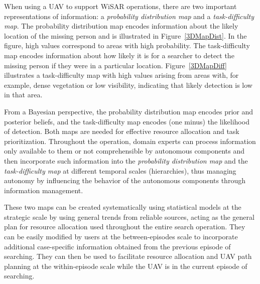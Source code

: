 When using a UAV to support WiSAR operations, there are two important representations of information: a \textit{probability distribution map} and a \textit{task-difficulty map}. The probability distribution map encodes information about the likely location of the missing person and is illustrated in Figure~\ref{3DMapDist}. In the figure, high values correspond to areas with high probability. The task-difficulty map encodes information about how likely it is for a searcher to detect the missing person if they were in a particular location. Figure~\ref{3DMapDiff} illustrates a task-difficulty map with high values arising from areas with, for example, dense vegetation or low visibility, indicating that likely detection is low in that area. 

From a Bayesian perspective, the probability distribution map encodes prior and posterior beliefs, and the task-difficulty map encodes (one minus) the likelihood of detection. Both maps are needed for effective resource allocation and task prioritization. Throughout the operation, domain experts can process information only available to them or not comprehensible by autonomous components and then incorporate such information into the \textit{probability distribution map} and the \textit{task-difficulty map} at different temporal scales (hierarchies), thus managing autonomy by influencing the behavior of the autonomous components through information management. 

These two maps can be created systematically using statistical models at the strategic scale by using general trends from reliable sources, acting as the general plan for resource allocation used throughout the entire search operation. They can be easily modified by users at the between-episodes scale to incorporate additional case-specific information obtained from the previous episode of searching. They can then be used to facilitate resource allocation and UAV path planning at the within-episode scale while the UAV is in the current episode of searching. 

